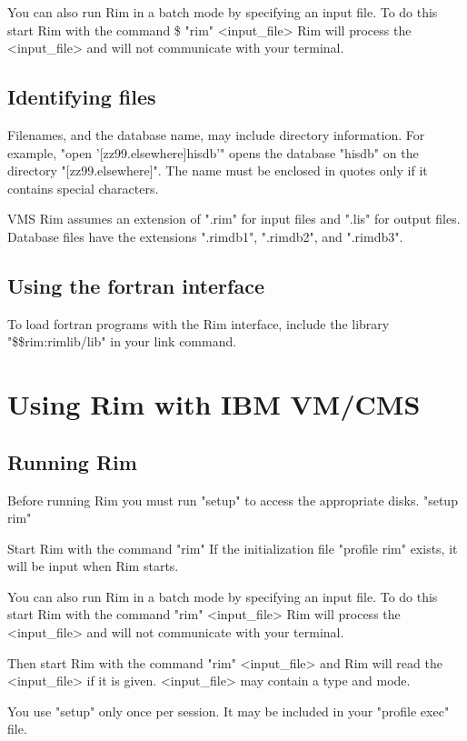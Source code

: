 You can also run Rim in a batch mode by specifying an input file.
To do this start Rim with the command
\<\$ "rim" <input_file>\>
Rim will process the <input_file> and will not communicate
with your terminal.
 
\subsection{Identifying files}
%
Filenames, and the database name, may include directory information.
For example,
\<"open '[zz99.elsewhere]hisdb'"\>
opens the database "hisdb" on the directory "[zz99.elsewhere]".
The name must be enclosed in quotes only if it
contains special characters.
 
VMS Rim assumes an extension of ".rim" for input files and
".lis" for output files.
Database files have the extensions ".rimdb1", ".rimdb2", and ".rimdb3".
 
 
\subsection{Using the fortran interface}
%
To load fortran programs with the Rim interface, include the
library
\<"\$\$rim:rimlib/lib"\>
in your link command.
 
\section{Using Rim with IBM VM/CMS}
%
 
\subsection{Running Rim}
Before running Rim you must run "setup" to access the appropriate disks.
\<"setup rim"\>
 
Start Rim with the command
\<"rim" \>
If the initialization file "profile rim" exists, it will
be input when Rim starts.
 
You can also run Rim in a batch mode by specifying an input file.
To do this start Rim with the command
\<"rim" <input_file>\>
Rim will process the <input_file> and will not communicate
with your terminal.
 
 
Then start Rim with the command
\<"rim" <input_file>\>
and Rim will read the <input_file> if it is given.
<input_file> may contain a type and mode.
 
You use "setup" only once per session.  It may be included in your
"profile exec" file.
 
